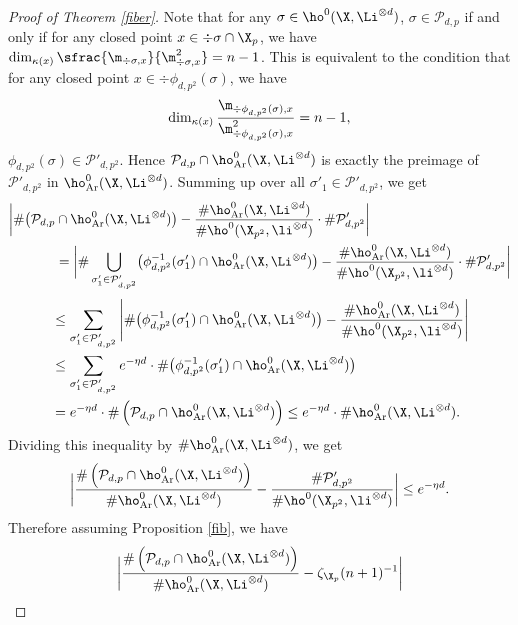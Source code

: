 \begin{proof}[Proof of Theorem \ref{fiber}]
Note that for any $\sigma\in \ho^0(\X, \Li^{\otimes d})$, $\sigma \in \mathcal{P}_{d,p}$ if and only if for any closed point $x\in \div \sigma\cap \X_p$, we have $\dim_{\kappa(x)}\sfrac{\m_{\div \sigma,x}}{\m^2_{\div \sigma, x}}=n-1$. This is equivalent to the condition that for any closed point $x\in \div \phi_{d,p^2}(\sigma)$, we have
\[
\dim_{\kappa(x)}\frac{\m_{\div \phi_{d,p^2}(\sigma),x}}{\m^2_{\div \phi_{d,p^2}(\sigma), x}}=n-1,
\]
\ie $\phi_{d,p^2}(\sigma)\in \mathcal{P}'_{d,p^2}$. Hence $\mathcal{P}_{d,p}\cap \ho^0_{\mathrm{Ar}}(\X, \Li^{\otimes d})$ is exactly the preimage of $\mathcal{P}'_{d,p^2}$ in $\ho^0_{\mathrm{Ar}}(\X, \Li^{\otimes d})$. Summing up over all $\sigma'_1\in \mathcal{P}'_{d,p^2}$, we get
\begin{align*}
\biggl| \#\bigl(\mathcal{P}_{d,p}&\cap \ho^0_{\mathrm{Ar}}(\X, \Li^{\otimes d})\bigr) -\frac{\#\ho^0_{\mathrm{Ar}}(\X, \Li^{\otimes d})}{\#\ho^0(\X_{p^2}, \li^{\otimes d})}\cdot\#\mathcal{P}'_{d,p^2} \biggr|\\
&=\biggl| \#\bigcup_{\sigma'_1\in \mathcal{P}'_{d,p^2}}\bigl(\phi_{d,p^2}^{-1}(\sigma'_1)\cap \ho^0_{\mathrm{Ar}}(\X, \Li^{\otimes d}) \bigr) -\frac{\#\ho^0_{\mathrm{Ar}}(\X, \Li^{\otimes d})}{\#\ho^0(\X_{p^2}, \li^{\otimes d})} \cdot \#\mathcal{P}'_{d,p^2} \biggr|
\end{align*}%
\vspace*{-1.45\baselineskip}%
\begin{align*}
&\leq \sum_{\sigma'_1\in \mathcal{P}'_{d,p^2}} \left| \#\bigl(\phi_{d,p^2}^{-1}(\sigma'_1)\cap \ho^0_{\mathrm{Ar}}(\X, \Li^{\otimes d}) \bigr)-\frac{\#\ho^0_{\mathrm{Ar}}(\X, \Li^{\otimes d})}{\#\ho^0(\X_{p^2}, \li^{\otimes d})} \right| \\
&\leq \sum_{\sigma'_1\in \mathcal{P}'_{d,p^2}} e^{-\eta d}\cdot \#\bigl(\phi_{d,p^2}^{-1}(\sigma'_1)\cap \ho^0_{\mathrm{Ar}}(\X, \Li^{\otimes d}) \bigr) \\
&= e^{-\eta d}\cdot \#\left(\mathcal{P}_{d,p}\cap \ho^0_{\mathrm{Ar}}(\X, \Li^{\otimes d})\right)\leq e^{-\eta d}\cdot\#\ho^0_{\mathrm{Ar}}(\X, \Li^{\otimes d}).
\end{align*}
Dividing this inequality by $\#\ho^0_{\mathrm{Ar}}(\X, \Li^{\otimes d})$, we get
\[
\biggl| \frac{\#\left(\mathcal{P}_{d,p}\cap \ho^0_{\mathrm{Ar}}(\X, \Li^{\otimes d})\right)}{\#\ho^0_{\mathrm{Ar}}(\X, \Li^{\otimes d})} -\frac{\#\mathcal{P}'_{d,p^2} }{\#\ho^0(\X_{p^2}, \li^{\otimes d})} \biggr|\leq e^{-\eta d}.
\]
Therefore assuming Proposition \ref{fib}, we have
\begin{align*}
\biggl| \frac{\#\left(\mathcal{P}_{d,p}\cap \ho^0_{\mathrm{Ar}}(\X, \Li^{\otimes d})\right)}{\#\ho^0_{\mathrm{Ar}}(\X, \Li^{\otimes d})} &-\zeta_{\X_p}(n+1)^{-1} \biggr| \\

\end{align*}
\end{proof}
